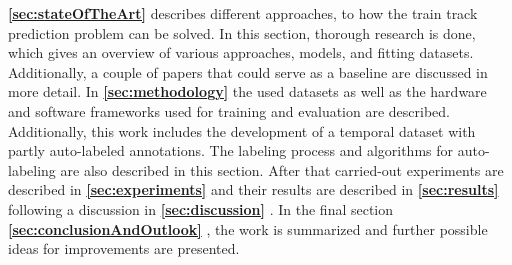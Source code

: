 \textbf{\ref{sec:stateOfTheArt}} \textbf{} describes different approaches, to how the train track prediction problem can be solved.
In this section, thorough research is done, which gives an overview of various approaches, models, and fitting datasets.
Additionally, a couple of papers that could serve as a baseline are discussed in more detail.
In \textbf{\ref{sec:methodology}} \textbf{} the used datasets as well as the hardware and software frameworks used for training and evaluation are described.
Additionally, this work includes the development of a temporal dataset with partly auto-labeled annotations.
The labeling process and algorithms for auto-labeling are also described in this section.
After that carried-out experiments are described in \textbf{\ref{sec:experiments}} \textbf{} and their results are described in \textbf{\ref{sec:results}} \textbf{} following a discussion in \textbf{\ref{sec:discussion}} \textbf{}.
In the final section \textbf{\ref{sec:conclusionAndOutlook}} \textbf{}, the work is summarized and further possible ideas for improvements are presented.
